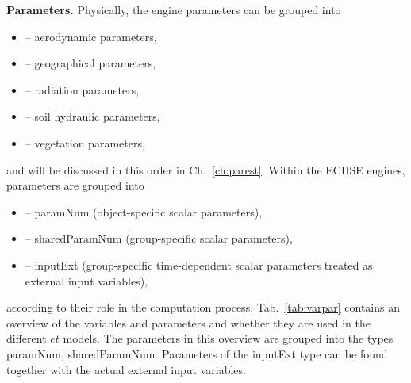 \documentclass{scrreprt}
\newenvironment{denseitem}{
  \begin{itemize}
    \setlength{\itemsep}{0pt}
    \setlength{\parskip}{0pt}
    \setlength{\parsep}{0pt}
}{
  \end{itemize}
}
\begin{document}
\noindent
\textbf{Parameters.}
Physically, the engine parameters can be grouped into
\begin{denseitem}
  \item[--] aerodynamic parameters,
  \item[--] geographical parameters,
  \item[--] radiation parameters,
  \item[--] soil hydraulic parameters,
  \item[--] vegetation parameters,
\end{denseitem}
%
and will be discussed in this order in Ch.~\ref{ch:parest}.
Within the ECHSE engines, parameters are grouped into
\begin{denseitem}
  \item[--] \textsf{paramNum} (object-specific scalar parameters),
  \item[--] \textsf{sharedParamNum} (group-specific scalar parameters),
  \item[--] \textsf{inputExt} (group-specific time-dependent scalar parameters treated as external input variables),
\end{denseitem}
%
according to their role in the computation process.
Tab.~\ref{tab:varpar} contains an overview of the variables and parameters and whether they are used in the different $et$ models.
The parameters in this overview are grouped into the types \textsf{paramNum}, \textsf{sharedParamNum}.
Parameters of the \textsf{inputExt} type can be found together with the actual external input variables.
\end{document}
